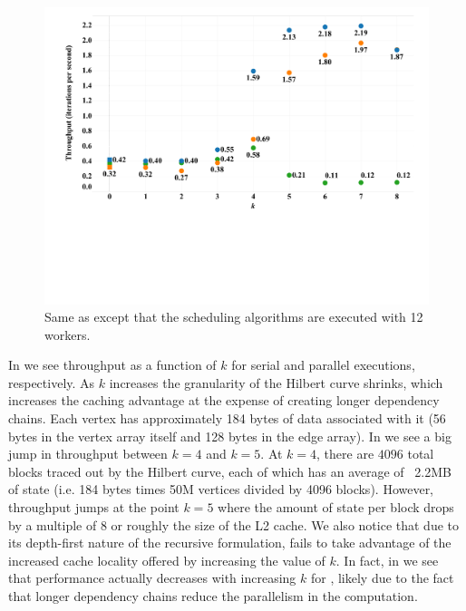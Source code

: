 \begin{figure}[h]
\centering
\includegraphics[width=5in,clip,trim=1cm 6cm 0 0]{figures/scalability_hilbert_bits_parallel.pdf}
\caption{Same as  except that
the scheduling algorithms are executed with 12 workers.}
\label{fig:scalability_hilbert_bits_parallel}
\end{figure}


In 
we see throughput as a function of $k$ for serial and parallel
executions, respectively.  As $k$ increases the granularity of the
Hilbert curve shrinks, which increases the caching advantage at
the expense of creating longer dependency chains.  Each vertex has
approximately 184 bytes of data associated with it (56 bytes in the
vertex array itself and 128 bytes in the edge array).  In 
 we see a big jump in
throughput between $k=4$ and $k=5$.  At $k=4$, there are $4096$
total blocks traced out by the Hilbert curve, each of which has
an average of ~2.2MB of state (i.e. 184 bytes times 50M vertices divided
by 4096 blocks).  However, throughput jumps at the point 
$k=5$ where the amount of state per block drops
by a multiple of 8 or roughly the size of the L2 cache.  We also
notice that due to its depth-first nature of the recursive formulation,
 fails to take advantage of the increased
cache locality offered by increasing the value of $k$.  In fact,
in  we see that performance
actually decreases with increasing $k$ for ,
likely due to the fact that longer dependency chains reduce the
parallelism in the computation.




